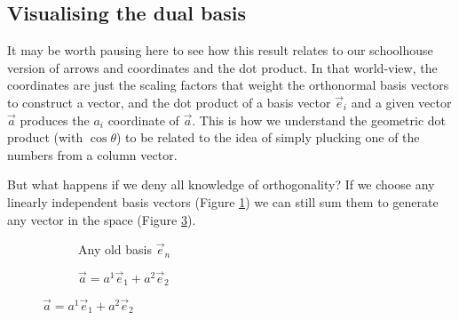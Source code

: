 \subsection{Visualising the dual basis} \label{sec:dual-bases}

It may be worth pausing here to see how this result relates to our schoolhouse version of arrows and coordinates and the dot product. In that world-view, the coordinates are just the scaling factors that weight the orthonormal basis vectors to construct a vector, and the dot product of a basis vector $\vec{e}_i$ and a given vector $\vec{a}$ produces the $a_i$ coordinate of $\vec{a}$. This is how we understand the geometric dot product (with $\cos \theta$) to be related to the idea of simply plucking one of the numbers from a column vector.

But what happens if we deny all knowledge of orthogonality? If we choose any linearly independent basis vectors (Figure \ref{fig:vectors-non-orth-1}) we can still sum them to generate any vector in the space (Figure \ref{fig:vectors-non-orth-2}).

\begin{figure}[h]
    \caption{Building a vector from any basis}
    \begin{subfigure}{0.5\textwidth}
        \centering
    \caption{Any old basis $\vec{e}_n$} \label{fig:vectors-non-orth-1}
    \end{subfigure}
    \begin{subfigure}{0.5\textwidth}
        \centering
        \caption{$\vec{a} = a^1 \vec{e}_1 + a^2 \vec{e}_2$} \label{fig:vectors-non-orth-2}
    \end{subfigure}
\end{figure}

